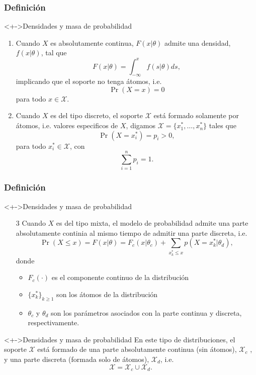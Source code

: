 \documentclass[cjk,t,compress]{beamer}
\begin{document}
	\frame
	{
    \frametitle{Definici\'on}
  		{\scriptsize  	
		
		\begin{block}<+->{Densidades y masa de probabilidad}
	  	{
		\begin{enumerate}
			\item Cuando $X$ es absolutamente continua, $F(x|\theta)$ admite una densidad, $f(x|\theta)$, tal que 
			$$
			F(x|\theta)=\int_{-\infty}^{x}f(s|\theta)ds,
			$$
			implicando que el soporte no tenga \'atomos, i.e.
			$$
			\Pr(X=x)=0$$
			para todo $x \in \mathcal{X}$.
			
			\item Cuando $X$ es del tipo discreto, el soporte $\mathcal{X}$ est\'a formado solamente por \'atomos, i.e. valores especificos de $X$, digamos $\mathcal{X}=\{x^{*}_1,\ldots,x^{*}_n\}$ tales que 
			$$
			\Pr(X=x^{*}_i)=p_i>0,
			$$
			para todo $x^{*}_i \in \mathcal{X}$, con
			$$
			\sum_{i=1}^{n}p_i=1.
			$$ 
		\end{enumerate}
		}
 		\end{block}  		

		}
	}


	\frame
	{
    \frametitle{Definici\'on}
  		{\scriptsize  	
		
		\begin{block}<+->{Densidades y masa de probabilidad}
	  	{
		\begin{enumerate}
			\item[3] Cuando $X$ es del tipo mixta, el modelo de probabilidad admite una parte absolutamente continia al mismo tiempo de admitir una parte discreta, i.e.
			\begin{equation}
				\Pr(X\leq x)=F(x|\theta) = F_c(x|\theta_c)+ \sum_{x^{*}_k \leq x} p(X=x^{*}_k|\theta_d),
			\end{equation}
			donde
			\begin{itemize}
				\item $F_c(\cdot)$ es el componente continuo de la distribuci\'on
				\item $\{x^{*}_k\}_{k\geq 1}$ son los \'atomos de la distribuci\'on
				\item $\theta_c$ y $\theta_d$ son los par\'ametros asociados con la parte continua y discreta, respectivamente.
			\end{itemize}
		\end{enumerate}
		}
 		\end{block}  		

		\begin{block}<+->{Densidades y masa de probabilidad}
	  	{
	  	En este tipo de distribuciones, el soporte $\mathcal{X}$ est\'a formado de una parte absolutamente continua (sin \'atomos), $\mathcal{X}_{c}$ , y una parte discreta (formada solo de \'atomos), $\mathcal{X}_{d}$, i.e.
		$$
		\mathcal{X}=\mathcal{X}_{c}\cup\mathcal{X}_d.
	  	$$
		}
 		\end{block}  		

		}
	}
\end{document}
